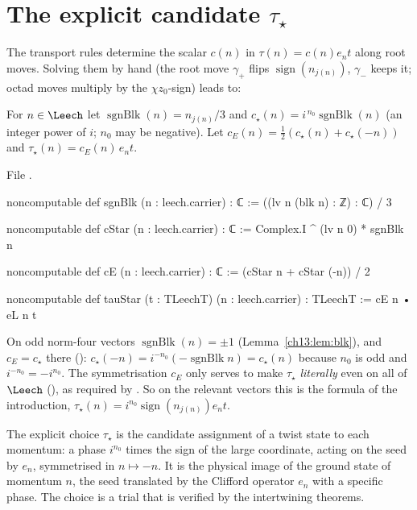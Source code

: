 \section{\texorpdfstring{The explicit candidate $\tau_\star$}{The explicit candidate taustar}}\label{ch13:sec:star}

The transport rules determine the scalar $c(n)$ in $\tau(n)=c(n)e_nt$ along root moves. Solving them by
hand (the root move $\gamma_+$ flips $\operatorname{sign}(n_{j(n)})$, $\gamma_-$ keeps it; octad moves multiply by the
$\chi z_0$-sign) leads to:
\begin{definition}[$\tau_\star$]\label{ch13:def:tauStar}
For $n\in\Leech$ let $\operatorname{sgnBlk}(n)=n_{j(n)}/3$ and $c_\star(n)=i^{\,n_0}\operatorname{sgnBlk}(n)$ (an integer power of
$i$; $n_0$ may be negative). Let $c_E(n)=\tfrac12(c_\star(n)+c_\star(-n))$ and $\tau_\star(n)=c_E(n)\,e_nt$.
\end{definition}
\noindent File .
\begin{leancode}
noncomputable def sgnBlk (n : leech.carrier) : ℂ := ((lv n (blk n) : ℤ) : ℂ) / 3

noncomputable def cStar (n : leech.carrier) : ℂ := Complex.I ^ (lv n 0) * sgnBlk n

noncomputable def cE (n : leech.carrier) : ℂ := (cStar n + cStar (-n)) / 2

noncomputable def tauStar (t : TLeechT) (n : leech.carrier) : TLeechT := cE n • eL n t
\end{leancode}
\begin{dictionary}
On odd norm-four vectors $\operatorname{sgnBlk}(n)=\pm1$ (Lemma~\ref{ch13:lem:blk}), and $c_E=c_\star$ there
(): $c_\star(-n)=i^{-n_0}(-\operatorname{sgnBlk}n)=c_\star(n)$ because $n_0$ is odd and $i^{-n_0}=-i^{n_0}$.
The symmetrisation $c_E$ only serves to make $\tau_\star$ \emph{literally} even on all of $\Leech$ (),
as required by . So on the relevant vectors this is the formula of the introduction,
$\tau_\star(n)=i^{n_0}\operatorname{sign}(n_{j(n)})e_nt$.
\end{dictionary}
\begin{physics}
The explicit choice $\tau_\star$ is the candidate assignment of a twist state to each momentum: a phase $i^{n_0}$ times the sign of the large coordinate, acting on the seed by $e_n$, symmetrised in $n\mapsto-n$. It is the physical image of the ground state of momentum $n$, the seed translated by the Clifford operator $e_n$ with a specific phase. The choice is a trial that is verified by the intertwining theorems.
\end{physics}
